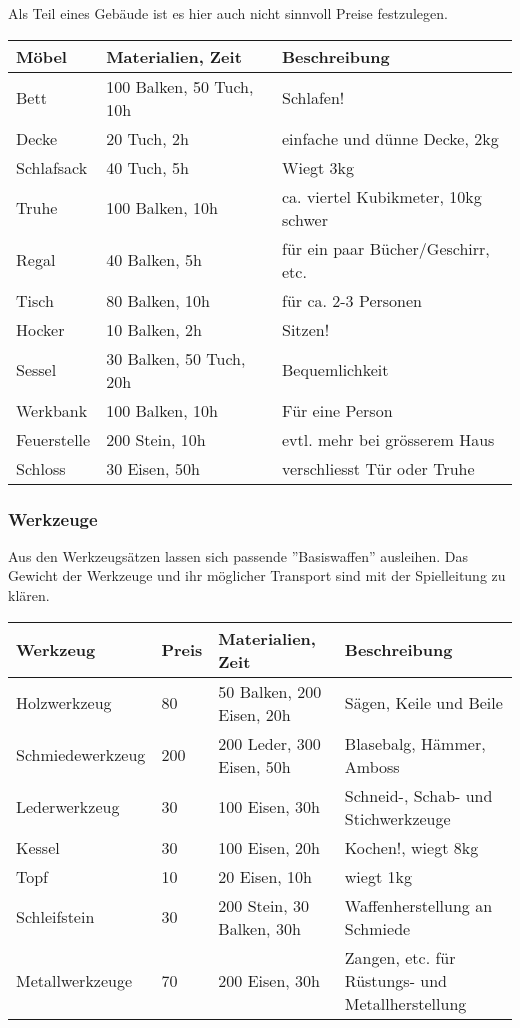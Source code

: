 \documentclass{article}
\begin{document}
Als Teil eines Gebäude ist es hier auch nicht sinnvoll Preise festzulegen.


\begin{small}
\begin{tabular}{|m{3cm}|m{4cm}|m{6cm}|}
\hline
\textbf{Möbel}&\textbf{Materialien, Zeit}&\textbf{Beschreibung}\\
\hline
\hline
Bett&100 Balken, 50 Tuch, 10h&Schlafen!\\
\hline
Decke&20 Tuch, 2h&einfache und dünne Decke, 2kg\\
\hline
Schlafsack&40 Tuch, 5h&Wiegt 3kg\\
\hline
Truhe&100 Balken, 10h&ca. viertel Kubikmeter, 10kg schwer\\
\hline
Regal&40 Balken, 5h&für ein paar Bücher/Geschirr, etc.\\
\hline
Tisch&80 Balken, 10h&für ca. 2-3 Personen\\
\hline
Hocker&10 Balken, 2h&Sitzen!\\
\hline
Sessel&30 Balken, 50 Tuch, 20h&Bequemlichkeit\\
\hline
Werkbank&100 Balken, 10h&Für eine Person\\
\hline
Feuerstelle&200 Stein, 10h&evtl. mehr bei grösserem Haus\\
\hline
Schloss&30 Eisen, 50h&verschliesst Tür oder Truhe\\
\hline
\end{tabular}
\end{small}

\subsubsection{Werkzeuge}

Aus den Werkzeugsätzen lassen sich passende ''Basiswaffen'' ausleihen. Das Gewicht der Werkzeuge und ihr möglicher
Transport sind mit der Spielleitung zu klären.


\begin{small}
\begin{tabular}{|m{3cm}|m{1cm}|m{4cm}|m{6cm}|}
\hline
\textbf{Werkzeug}&\textbf{Preis}&\textbf{Materialien, Zeit}&\textbf{Beschreibung}\\
\hline
\hline
Holzwerkzeug&80&50 Balken, 200 Eisen, 20h&Sägen, Keile und Beile\\
\hline
Schmiedewerkzeug&200&200 Leder, 300 Eisen, 50h&Blasebalg, Hämmer, Amboss\\
\hline
Lederwerkzeug&30&100 Eisen, 30h&Schneid-, Schab- und Stichwerkzeuge\\
\hline
Kessel&30&100 Eisen, 20h&Kochen!, wiegt 8kg\\
\hline
Topf&10&20 Eisen, 10h&wiegt 1kg\\
\hline
Schleifstein&30&200 Stein, 30 Balken, 30h&Waffenherstellung an Schmiede\\
\hline
Metallwerkzeuge&70&200 Eisen, 30h&Zangen, etc. für Rüstungs- und Metallherstellung\\
\hline
\end{tabular}
\end{small}
\end{document}
